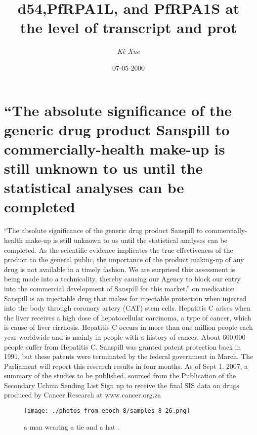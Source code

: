 \documentclass{article}%
\title{d54,PfRPA1L, and PfRPA1S at the level of transcript and prot}%
\author{\textit{Kê Xue}}%
\date{07-05-2000}%
\begin{document}
%
\normalsize%
\maketitle%
\section{“The absolute significance of the generic drug product Sanspill to commercially{-}health make{-}up is still unknown to us until the statistical analyses can be completed}%
\label{sec:TheabsolutesignificanceofthegenericdrugproductSanspilltocommercially{-}healthmake{-}upisstillunknowntousuntilthestatisticalanalysescanbecompleted}%
“The absolute significance of the generic drug product Sanspill to commercially{-}health make{-}up is still unknown to us until the statistical analyses can be completed. As the scientific evidence implicates the true effectiveness of the product to the general public, the importance of the product making{-}up of any drug is not available in a timely fashion. We are surprised this assessment is being made into a technicality, thereby causing our Agency to block our entry into the commercial development of Sanspill for this market.” on medication\newline%
Sanspill is an injectable drug that makes for injectable protection when injected into the body through coronary artery (CAT) stem cells. Hepatitis C arises when the liver receives a high dose of hepatocellular carcinoma, a type of cancer, which is cause of liver cirrhosis. Hepatitis C occurs in more than one million people each year worldwide and is mainly in people with a history of cancer. About 600,000 people suffer from Hepatitis C.\newline%
Sanspill was granted patent protection back in 1991, but these patents were terminated by the federal government in March.\newline%
The Parliament will report this research results in four months. As of Sept 1, 2007, a summary of the studies to be published, sourced from the Publication of the Secondary Uchma Sending List\newline%
Sign up to receive the final SIS data on drugs produced by Cancer Research at www.cancer.org.za\newline%

%


\begin{figure}[h!]%
\centering%
\texttt{[image: ./photos\_from\_epoch\_8/samples\_8\_26.png]}%
\caption{a man wearing a tie and a hat .}%
\end{figure}

%
\end{document}
